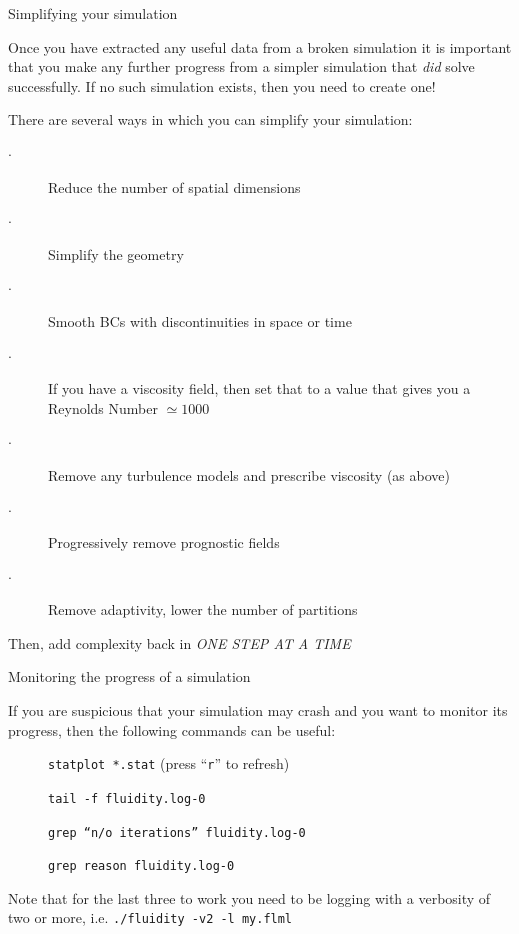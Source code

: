 \documentclass[t]{beamer}
\begin{document}
\begin{frame}{Simplifying your simulation}

Once you have extracted any useful data from a broken simulation
it is important that you make any further progress from a simpler simulation that {\it did} solve successfully.
If no such simulation exists, then you need to create one!

\vspace{1ex}
There are several ways in which you can simplify your simulation:

\begin{description}
 \item[$\cdot$] Reduce the number of spatial dimensions
 \item[$\cdot$] Simplify the geometry 
 \item[$\cdot$] Smooth BCs with discontinuities in space or time
 \item[$\cdot$] If you have a viscosity field, then set that to a value that gives you a Reynolds Number $\simeq 1000$
 \item[$\cdot$] Remove any turbulence models and prescribe viscosity (as above)
 \item[$\cdot$] Progressively remove prognostic fields
 \item[$\cdot$] Remove adaptivity, lower the number of partitions
\end{description}

Then, add complexity back in \emph{\color{red}ONE STEP AT A TIME}

\end{frame}


\begin{frame}{Monitoring the progress of a simulation}

If you are suspicious that your simulation may crash and you want to monitor its progress,
then the following commands can be useful:

\vspace{1ex}
\begin{description}
 \item[] {\tt statplot *.stat} (press ``{\tt r}'' to refresh)
 \item[] {\tt tail -f fluidity.log-0}
 \item[] {\tt grep ``n/o iterations'' fluidity.log-0}
 \item[] {\tt grep reason fluidity.log-0}
\end{description}

Note that for the last three to work you need to be logging with a verbosity of two or more, 
i.e. {\tt ./fluidity -v2 -l my.flml}

\end{frame}
\end{document}

